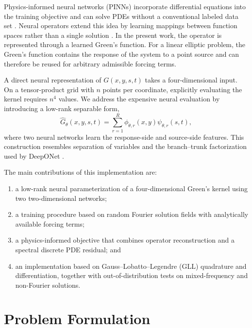 \documentclass[11pt,a4paper]{article}
\newcommand{\Ghat}{\widehat{G}_{\theta}}
\begin{document}
Physics-informed neural networks (PINNs) incorporate differential equations into the training objective and can solve PDEs without a conventional labeled data set \cite{raissi2019pinn}. Neural operators extend this idea by learning mappings between function spaces rather than a single solution \cite{lu2021deeponet,li2021fno}. In the present work, the operator is represented through a learned Green's function. For a linear elliptic problem, the Green's function contains the response of the system to a point source and can therefore be reused for arbitrary admissible forcing terms.

A direct neural representation of $G(x,y,s,t)$ takes a four-dimensional input. On a tensor-product grid with $n$ points per coordinate, explicitly evaluating the kernel requires $n^4$ values. We address the expensive neural evaluation by introducing a low-rank separable form,
\begin{equation}
  \Ghat(x,y,s,t)=\sum_{r=1}^{R}\phi_{\theta,r}(x,y)\psi_{\theta,r}(s,t),
  \label{eq:lowrank}
\end{equation}
where two neural networks learn the response-side and source-side features. This construction resembles separation of variables and the branch--trunk factorization used by DeepONet \cite{lu2021deeponet}.

The main contributions of this implementation are:
\begin{enumerate}[leftmargin=2em]
  \item a low-rank neural parameterization of a four-dimensional Green's kernel using two two-dimensional networks;
  \item a training procedure based on random Fourier solution fields with analytically available forcing terms;
  \item a physics-informed objective that combines operator reconstruction and a spectral discrete PDE residual; and
  \item an implementation based on Gauss--Lobatto--Legendre (GLL) quadrature and differentiation, together with out-of-distribution tests on mixed-frequency and non-Fourier solutions.
\end{enumerate}

\section{Problem Formulation}
\end{document}

